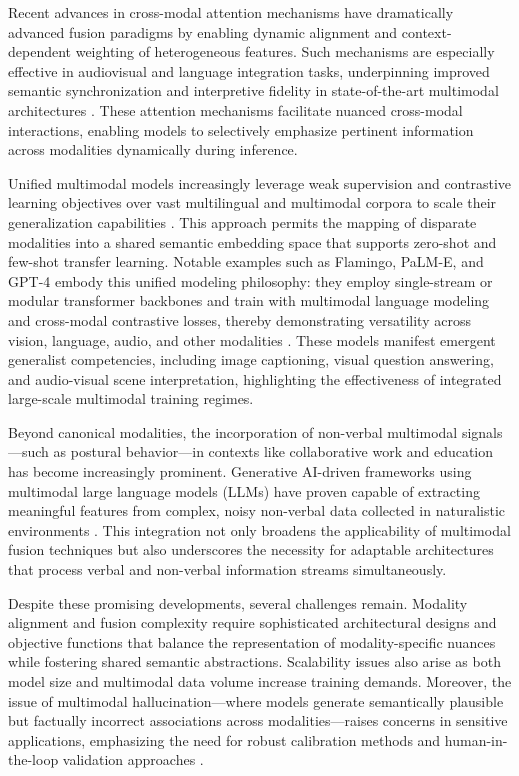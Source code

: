 \documentclass[sigconf]{acmart}
\begin{document}
Recent advances in cross-modal attention mechanisms have dramatically advanced fusion paradigms by enabling dynamic alignment and context-dependent weighting of heterogeneous features. Such mechanisms are especially effective in audiovisual and language integration tasks, underpinning improved semantic synchronization and interpretive fidelity in state-of-the-art multimodal architectures \cite{ref3,ref4,ref5,ref12,ref32}. These attention mechanisms facilitate nuanced cross-modal interactions, enabling models to selectively emphasize pertinent information across modalities dynamically during inference.

Unified multimodal models increasingly leverage weak supervision and contrastive learning objectives over vast multilingual and multimodal corpora to scale their generalization capabilities \cite{ref28,ref31}. This approach permits the mapping of disparate modalities into a shared semantic embedding space that supports zero-shot and few-shot transfer learning. Notable examples such as Flamingo, PaLM-E, and GPT-4 embody this unified modeling philosophy: they employ single-stream or modular transformer backbones and train with multimodal language modeling and cross-modal contrastive losses, thereby demonstrating versatility across vision, language, audio, and other modalities \cite{ref6}. These models manifest emergent generalist competencies, including image captioning, visual question answering, and audio-visual scene interpretation, highlighting the effectiveness of integrated large-scale multimodal training regimes.

Beyond canonical modalities, the incorporation of non-verbal multimodal signals---such as postural behavior---in contexts like collaborative work and education has become increasingly prominent. Generative AI-driven frameworks using multimodal large language models (LLMs) have proven capable of extracting meaningful features from complex, noisy non-verbal data collected in naturalistic environments \cite{ref1,ref2,ref3}. This integration not only broadens the applicability of multimodal fusion techniques but also underscores the necessity for adaptable architectures that process verbal and non-verbal information streams simultaneously.

Despite these promising developments, several challenges remain. Modality alignment and fusion complexity require sophisticated architectural designs and objective functions that balance the representation of modality-specific nuances while fostering shared semantic abstractions. Scalability issues also arise as both model size and multimodal data volume increase training demands. Moreover, the issue of multimodal hallucination---where models generate semantically plausible but factually incorrect associations across modalities---raises concerns in sensitive applications, emphasizing the need for robust calibration methods and human-in-the-loop validation approaches \cite{ref32,ref6}.
\end{document}
